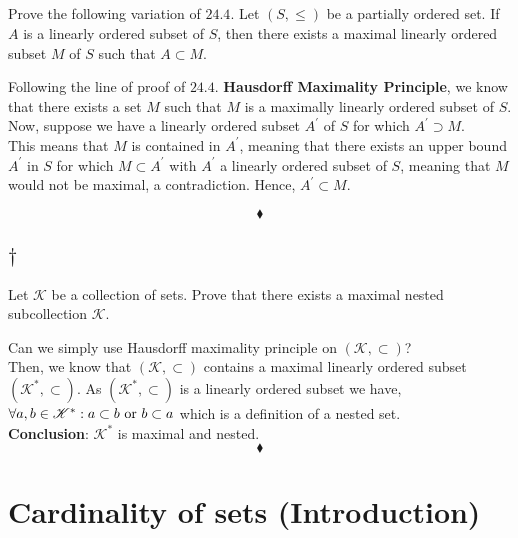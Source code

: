 \subsection{}
\begin{tcolorbox}
Prove the following variation of $\mathbf{24.4}$. Let $(S, \leq)$ be a partially ordered set. If $A$ is a linearly ordered subset of $S$, then there exists a maximal linearly ordered subset $M$ of $S$ such that $A\subset M$.  

\end{tcolorbox}
$$ $$
Following the line of proof of $\mathbf{24.4.}$ \textbf{Hausdorff Maximality Principle}, we know that there exists a set $M$ such that $M$ is a maximally linearly ordered subset of $S$.\\
Now, suppose we have a linearly ordered subset $A^{'}$ of $S$ for  which $A^{'}\supset M$.\\
This means that $M$ is contained in $A^{'}$, meaning that there exists an upper bound $A^{'}$ in $S$ for which $M \subset A^{'}$ with $A^{'}$ a linearly ordered subset of $S$, meaning that $M$ would not be maximal, a contradiction. Hence, $A^{'}\subset M$.

$$\blacklozenge$$

\subsection{$\dagger$}
\begin{tcolorbox}
Let $\mathscr{K}$ be a collection of sets. Prove that there exists a maximal nested subcollection $\mathscr{K}$. 
\end{tcolorbox}
$$ $$
Can we simply use Hausdorff maximality principle on $(\mathscr{K},\subset)$? \\
Then, we know that $(\mathscr{K},\subset)$ contains a maximal linearly ordered subset  $(\mathscr{K}^{*},\subset)$. As $(\mathscr{K}^{*},\subset)$ is a linearly ordered subset we have, $ \forall a,b\in \mathscr{K}^{*}:a\subset b\text{ or } b\subset a$ which is a definition of a nested set.\\
\textbf{Conclusion}: $\mathscr{K}^{*}$ is maximal and nested.
$$\blacklozenge$$

\newpage

 \section{Cardinality of sets (Introduction)}
